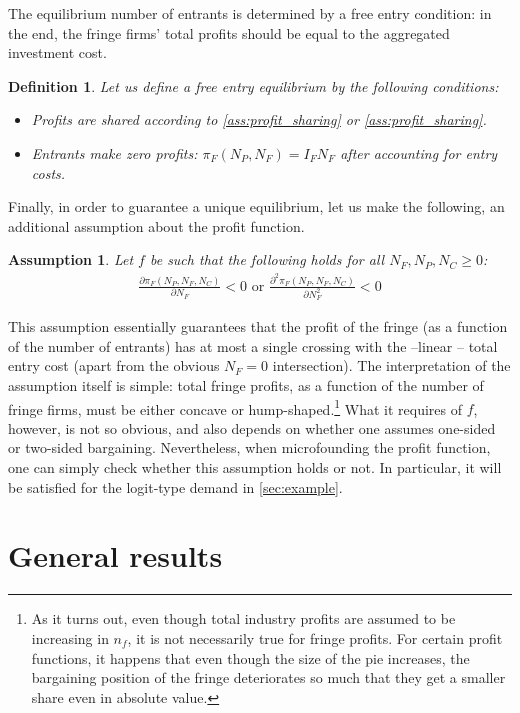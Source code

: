\documentclass[a4paper]{article}
\newtheorem{definition}{Definition}
\newtheorem{assumption}{Assumption}
\begin{document}
The equilibrium number of entrants is determined by a free entry condition: in the end, the fringe firms' total profits should be equal to the aggregated investment cost.
\begin{definition}
    \label{ass:free_entry}
    Let us define a free entry equilibrium by the following conditions:
    \begin{itemize}
        \item Profits are shared according to \cref{ass:profit_sharing} or \cref{ass:profit_sharing}.
        \item Entrants make zero profits: $\pi_F(N_P, N_F) = I_F N_F$ after accounting for entry costs.
    \end{itemize}
\end{definition}

Finally, in order to guarantee a unique equilibrium, let us make the following, an additional assumption about the profit function.
\begin{assumption}
    \label{ass:single_crossing}
    Let $f$ be such that the following holds for all $N_F, N_P, N_C \geq 0$:
    \begin{align*}
        \frac{\partial \pi_F(N_P, N_F, N_C)}{\partial N_F} < 0 \text{ or } \frac{\partial^2 \pi_F(N_P, N_F, N_C)}{\partial N_F^2} < 0
    \end{align*}
\end{assumption}
This assumption essentially guarantees that the profit of the fringe (as a function of the number of entrants) has at most a single crossing with the --linear -- total entry cost (apart from the obvious $N_F=0$ intersection).
The interpretation of the assumption itself is simple: total fringe profits, as a function of the number of fringe firms, must be either concave or hump-shaped.\footnote{
    As it turns out, even though total industry profits are assumed to be increasing in $n_f$, it is not necessarily true for fringe profits.
    For certain profit functions, it happens that even though the size of the pie increases, the bargaining position of the fringe deteriorates so much that they get a smaller share even in absolute value.
}
What it requires of $f$, however, is not so obvious, and also depends on whether one assumes one-sided or two-sided bargaining.
Nevertheless, when microfounding the profit function, one can simply check whether this assumption holds or not.
In particular, it will be satisfied for the logit-type demand in \cref{sec:example}.


\section{General results}
\label{sec:results}
\end{document}
